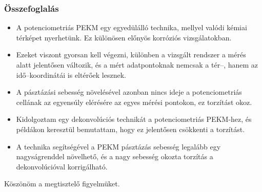 \documentclass{beamer}
\begin{document}
\begin{frame}
	\frametitle{Összefoglalás}
	\centering
\footnotesize
\begin{itemize}

\item A potenciometriás PEKM egy egyedülálló technika, mellyel valódi kémiai térképet nyerhetünk. Ez különösen előnyös korróziós vizsgálatokban.

\item Ezeket viszont gyorsan kell végezni, különben a vizsgált rendszer a mérés alatt jelentősen változik, és a mért adatpontoknak nemcsak a tér--, hanem az idő--koordinátái is eltérőek lesznek.

\item A pásztázási sebesség növelésével azonban nincs ideje a potenciometriás cellának az egyensúly elérésére az egyes mérési pontokon, ez torzítást okoz.

\item Kidolgoztam egy dekonvolúciós technikát a potenciometriás PEKM-hez, és példákon keresztül bemutattam, hogy ez jelentősen csökkenti a torzítást.

\item A technika segítségével a PEKM pásztázás sebesség legalább egy nagyságrenddel növelhető, és a nagy sebesség okozta torzítás a dekonvolúcióval korrigálható.

\end{itemize}
\end{frame}

\begin{frame}
	\centering
	Köszönöm a megtisztelő figyelmüket.
\end{frame}
\end{document}
